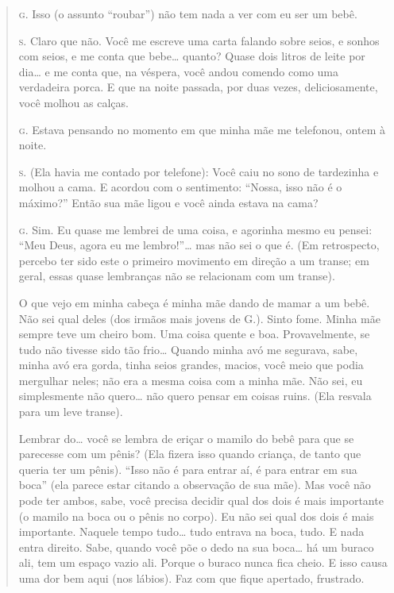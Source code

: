 \begin{quote}

\noindent\hskip0mm\textsc{g.} Isso (o assunto ``roubar'') não tem nada a
ver com eu ser um bebê.

\noindent\hskip0mm\textsc{s.} Claro que não. Você me escreve uma carta falando sobre seios, e
sonhos com seios, e me conta que bebe\ldots{} quanto? Quase dois litros de
leite por dia\ldots{} e me conta que, na véspera, você andou comendo como
uma verdadeira porca. E que na noite passada, por duas vezes,
deliciosamente, você molhou as calças.

\noindent\hskip0mm\textsc{g.} Estava pensando no momento em que minha mãe me telefonou, ontem à
noite.

\noindent\hskip0mm\textsc{s.} (Ela havia me contado por telefone): Você caiu no sono de tardezinha
e molhou a cama. E acordou com o sentimento: ``Nossa, isso
não é o máximo?'' Então sua mãe ligou e você ainda estava
na cama?

\noindent\hskip0mm\textsc{g.} Sim. Eu quase me lembrei de uma coisa, e agorinha mesmo eu pensei:
``Meu Deus, agora eu me lembro!''\ldots{} mas não
sei o que é. (Em retrospecto, percebo ter sido este o primeiro
movimento em direção a um transe; em geral, essas quase lembranças não
se relacionam com um transe).

O que vejo em minha cabeça é minha mãe dando de mamar a um bebê. Não
sei qual deles (dos irmãos mais jovens de G.). Sinto fome. Minha mãe
sempre teve um cheiro bom. Uma coisa quente e boa. Provavelmente, se
tudo não tivesse sido tão frio\ldots{} Quando minha avó me segurava, sabe,
minha avó era gorda, tinha seios grandes, macios, você meio que podia
mergulhar neles; não era a mesma coisa com a minha mãe. Não sei, eu
simplesmente não quero\ldots{} não quero pensar em coisas ruins. (Ela
resvala para um leve transe).

Lembrar do\ldots{} você se lembra de eriçar o mamilo do bebê para que se
parecesse com um pênis? (Ela fizera isso quando criança, de tanto que
queria ter um pênis). ``Isso não é para entrar aí, é para
entrar em sua boca'' (ela parece estar citando a
observação de sua mãe). Mas você não pode ter ambos, sabe, você precisa
decidir qual dos dois é mais importante (o mamilo na boca ou o pênis no
corpo). Eu não sei qual dos dois é mais importante. Naquele tempo
tudo\ldots{} tudo entrava na boca, tudo. E nada entra direito. Sabe, quando
você põe o dedo na sua boca\ldots{} há um buraco ali, tem um espaço vazio
ali. Porque o buraco nunca fica cheio. E isso causa uma dor bem aqui
(nos lábios). Faz com que fique apertado, frustrado.


\end{quote}
